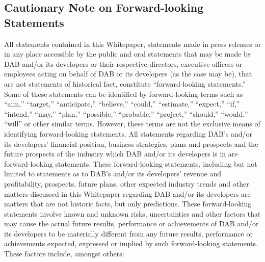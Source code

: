 \documentclass[review]{elsarticle}
\begin{document}
\subsection{Cautionary Note on Forward-looking Statements}
All statements contained in this Whitepaper, statements made in press releases or in any place accessible by the public and oral statements that may be made by DAB and/or its developers or their respective directors, executive officers or employees acting on behalf of DAB or its developers (as the case may be), that are not statements of historical fact, constitute ``forward-looking statements.'' Some of these statements can be identified by forward-looking terms such as ``aim,'' ``target,'' ``anticipate,'' ``believe,'' ``could,'' ``estimate,'' ``expect,'' ``if,'' ``intend,'' ``may,'' ``plan,'' ``possible,'' ``probable,'' ``project,'' ``should,'' ``would,'' ``will'' or other similar terms. However, these terms are not the exclusive means of identifying forward-looking statements. All statements regarding DAB's and/or its developers' financial position, business strategies, plans and prospects and the future prospects of the industry which DAB and/or its developers is in are forward-looking statements. These forward-looking statements, including but not limited to statements as to DAB's and/or its developers' revenue and profitability, prospects, future plans, other expected industry trends and other matters discussed in this Whitepaper regarding DAB and/or its developers are matters that are not historic facts, but only predictions. 
These forward-looking statements involve known and unknown risks, uncertainties and other factors that may cause the actual future results, performance or achievements of DAB and/or its developers to be materially different from any future results, performance or achievements expected, expressed or implied by such forward-looking statements. These factors include, amongst others: 
\end{document}
